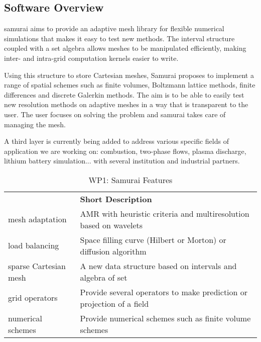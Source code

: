 \subsection{Software Overview}
\label{sec:WP1:Samurai:summary}

samurai aims to provide an adaptive mesh library for flexible numerical simulations that makes it easy to test new methods. The interval structure coupled with a set algebra allows meshes to be manipulated efficiently, making inter- and intra-grid computation kernels easier to write.

Using this structure to store Cartesian meshes, Samurai proposes to implement a range of spatial schemes such as finite volumes, Boltzmann lattice methods, finite differences and discrete Galerkin methods. The aim is to be able to easily test new resolution methods on adaptive meshes in a way that is transparent to the user. The user focuses on solving the problem and samurai takes care of managing the mesh.

A third layer is currently being added to address various specific fields of application we are working on: combustion, two-phase
flows, plasma discharge, lithium battery simulation... with several  institution and industrial partners.

\begin{table}[h!]
    \centering
    {
        \setlength{\parindent}{0pt}
        \def\arraystretch{1.25}
        {
            \fontsize{9}{11}\selectfont
            \begin{tabular}{!{\color{numpexgray}\vrule}p{.25\linewidth}!{\color{numpexgray}\vrule}p{.6885\linewidth}!{\color{numpexgray}\vrule}}

     &  {\rule{0pt}{2.5ex}\color{white}\bf Short Description }\\

        mesh adaptation & AMR with heuristic criteria and multiresolution based on wavelets \\
       load balancing & Space filling curve (Hilbert or Morton) or diffusion algorithm \\
       sparse Cartesian mesh & A new data structure based on intervals and algebra of set \\
       grid operators & Provide several operators to make prediction or projection of a field \\
      numerical schemes & Provide numerical schemes such as finite volume schemes \\


\end{tabular}
        }
    }
    \caption{WP1: Samurai Features}
    \label{tab:WP1:Samurai:features}
\end{table}


